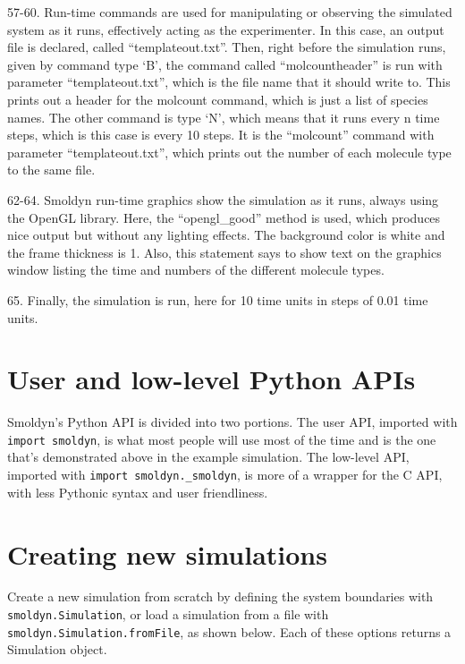 \documentclass {scrbook}
\newcommand {\ttt} {\texttt}
\begin{document}
\begin{description}
\item{57-60.} Run-time commands are used for manipulating or observing the simulated system as it runs, effectively acting as the experimenter. In this case, an output file is declared, called ``templateout.txt''. Then, right before the simulation runs, given by command type `B', the command called ``molcountheader'' is run with parameter ``templateout.txt'', which is the file name that it should write to. This prints out a header for the molcount command, which is just a list of species names. The other command is type `N', which means that it runs every n time steps, which is this case is every 10 steps. It is the ``molcount'' command with parameter ``templateout.txt'', which prints out the number of each molecule type to the same file.

\item{62-64.} Smoldyn run-time graphics show the simulation as it runs, always using the OpenGL library. Here, the ``opengl\_good'' method is used, which produces nice output but without any lighting effects. The background color is white and the frame thickness is 1. Also, this statement says to show text on the graphics window listing the time and numbers of the different molecule types.

\item{65.} Finally, the simulation is run, here for 10 time units in steps of 0.01 time units.

\end{description}

\section{User and low-level Python APIs}

Smoldyn's Python API is divided into two portions. The user API, imported with \ttt{import smoldyn}, is what most people will use most of the time and is the one that's demonstrated above in the example simulation. The low-level API, imported with \ttt{import smoldyn.\_smoldyn}, is more of a wrapper for the C API, with less Pythonic syntax and user friendliness.

\section{Creating new simulations}

Create a new simulation from scratch by defining the system boundaries with \ttt{smoldyn.Simulation}, or load a simulation from a file with \ttt{smoldyn.Simulation.fromFile}, as shown below. Each of these options returns a Simulation object.
\end{document}
